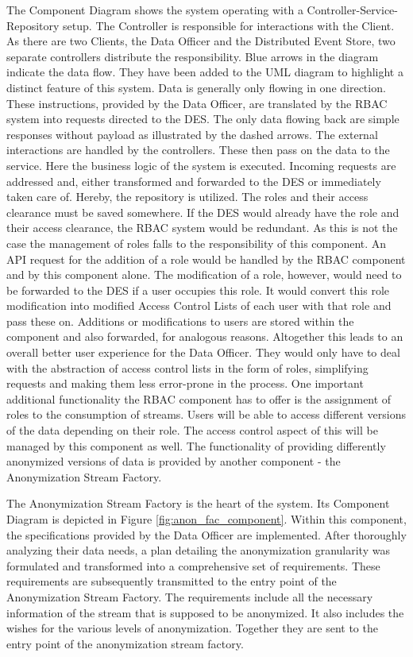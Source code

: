 The Component Diagram shows the system operating with a Controller-Service-Repository setup. The Controller is responsible for interactions with the Client. As there are two Clients, the Data Officer and the Distributed Event Store, two separate controllers distribute the responsibility. Blue arrows in the diagram indicate the data flow. They have been added to the UML diagram to highlight a distinct feature of this system. Data is generally only flowing in one direction. These instructions, provided by the Data Officer, are translated by the RBAC system into requests directed to the \ac{DES}. The only data flowing back are simple responses without payload as illustrated by the dashed arrows. The external interactions are handled by the controllers. These then pass on the data to the service. Here the business logic of the system is executed. Incoming requests are addressed and, either transformed and forwarded to the \ac{DES} or immediately taken care of. Hereby, the repository is utilized. The roles and their access clearance must be saved somewhere. If the \ac{DES} would already have the role and their access clearance, the \ac{RBAC} system would be redundant. As this is not the case the management of roles falls to the responsibility of this component. An API request for the addition of a role would be handled by the \ac{RBAC} component and by this component alone. The modification of a role, however, would need to be forwarded to the \ac{DES} if a user occupies this role. It would convert this role modification into modified Access Control Lists of each user with that role and pass these on. Additions or modifications to users are stored within the component and also forwarded, for analogous reasons. Altogether this leads to an overall better user experience for the Data Officer. They would only have to deal with the abstraction of access control lists in the form of roles, simplifying requests and making them less error-prone in the process. One important additional functionality the \ac{RBAC} component has to offer is the assignment of roles to the consumption of streams. Users will be able to access different versions of the data depending on their role. The access control aspect of this will be managed by this component as well. The functionality of providing differently anonymized versions of data is provided by another component - the Anonymization Stream Factory. \par

The Anonymization Stream Factory is the heart of the system. Its Component Diagram is depicted in Figure \ref{fig:anon_fac_component}. Within this component, the specifications provided by the Data Officer are implemented. After thoroughly analyzing their data needs, a plan detailing the anonymization granularity was formulated and transformed into a comprehensive set of requirements. These requirements are subsequently transmitted to the entry point of the Anonymization Stream Factory. The requirements include all the necessary information of the stream that is supposed to be anonymized. It also includes the wishes for the various levels of anonymization. Together they are sent to the entry point of the anonymization stream factory.\par

